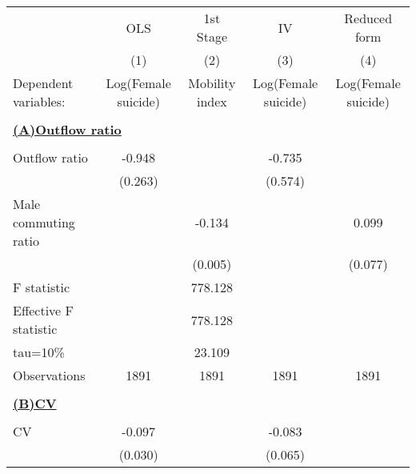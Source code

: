 \begin{tabular}{l*{4}{c}} \toprule
                    &\multicolumn{1}{c}{OLS}&\multicolumn{1}{c}{1st Stage}&\multicolumn{1}{c}{IV}&\multicolumn{1}{c}{Reduced form}\\\cmidrule(lr){2-2}\cmidrule(lr){3-3}\cmidrule(lr){4-4}\cmidrule(lr){5-5}
                    &\multicolumn{1}{c}{(1)}         &\multicolumn{1}{c}{(2)}         &\multicolumn{1}{c}{(3)}         &\multicolumn{1}{c}{(4)}         \\
Dependent variables: &Log(Female suicide)         &Mobility index         &Log(Female suicide)         &Log(Female suicide)         \\
\hline \\ \multicolumn{5}{l}{\textbf{\underline{(A)Outflow ratio}}} \\\\[-1ex]
Outflow ratio       &      -0.948\sym{***}&                     &      -0.735         &                     \\
                    &     (0.263)         &                     &     (0.574)         &                     \\
\addlinespace
Male commuting ratio&                     &      -0.134\sym{***}&                     &       0.099         \\
                    &                     &     (0.005)         &                     &     (0.077)         \\
\midrule
F statistic         &                     &     778.128         &                     &                     \\
Effective F statistic&                     &     778.128         &                     &                     \\
tau=10\%            &                     &      23.109         &                     &                     \\
Observations        &        1891         &        1891         &        1891         &        1891         \\
\hline \\ \multicolumn{5}{l}{\textbf{\underline{(B)CV}}} \\\\[-1ex]
CV                  &      -0.097\sym{***}&                     &      -0.083         &                     \\
                    &     (0.030)         &                     &     (0.065)         &                     \\

\end{tabular}
